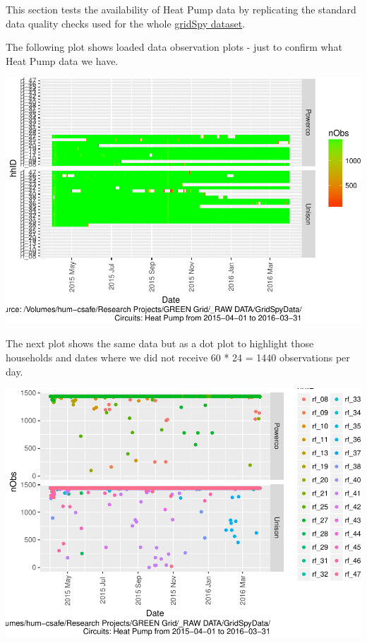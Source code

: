 \documentclass[]{article}
\begin{document}
This section tests the availability of Heat Pump data by replicating the
standard data quality checks used for the whole
\href{https://git.soton.ac.uk/ba1e12/nzGREENGrid/tree/master/dataProcessing/gridSpy}{gridSpy
dataset}.

The following plot shows loaded data observation plots - just to confirm
what Heat Pump data we have.

\includegraphics{ggProfile_Heat Pump_2015-04-01_2016-03-31_files/figure-latex/loadedFilesObs Tile Plot-1.pdf}

The next plot shows the same data but as a dot plot to highlight those
households and dates where we did not receive 60 * 24 = 1440
observations per day.

\includegraphics{ggProfile_Heat Pump_2015-04-01_2016-03-31_files/figure-latex/loadedFilesObs point plot-1.pdf}
\end{document}
